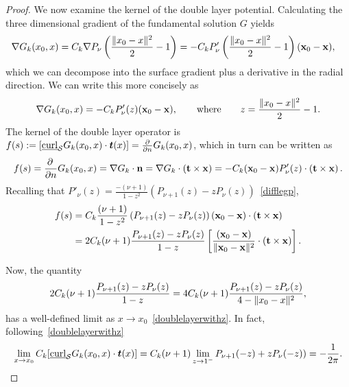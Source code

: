 \begin{proof}
We now examine the kernel of the double layer potential. Calculating the
three dimensional gradient of the fundamental solution $G$ yields
\begin{align*}
  \nabla G_k(x_0,x) &= C_k \nabla P_\nu\left(
    \frac{\|x_0-x\|^2}{2}-1\right) = 
  -C_k P'_\nu\left(\frac{\|x_0-x\|^2}{2}-1\right)
    (\mathbf{x}_{0}-\mathbf{x}),
\end{align*}
which we can decompose into the surface gradient plus a derivative in
the radial direction. We can write this more concisely as
\begin{align*}
\nabla G_k(x_0,x)=-C_k P'_{\nu}(z) (\mathbf{x}_0-\mathbf{x}), 
  \qquad \mbox{where}\qquad z=\frac{\|{ x_0}-{x}\|^2}{2}-1.
\end{align*} 
The kernel of the double layer operator is $f(s): =
[\underline{\mbox{curl}}_{\S}G_{k}(x_{0},x) \cdot \vec{t}(x)]=
\frac{\partial}{\partial n} G_k({x}_{0},{x})$, which in turn can be
written as 
\begin{align*}
 f(s)=\frac{\partial \, }{\partial n} G_{k}(x_{0},x) 
 =\nabla G_{k} \cdot \mathbf{n} = \nabla G_k\cdot \left( \mathbf{t}
 \times \mathbf{x} \right) 
 =-C_k (\mathbf{x}_0-\mathbf{x})P'_{\nu}(z)\cdot \left(
 \mathbf{t} \times \mathbf{x} \right).
\end{align*}
Recalling that $P'_{\nu}(z)=\frac{-(\nu+1)}{1-z^2}(P_{\nu+1}(z)-z
P_{\nu}(z))$~\eqref{difflegp},
\begin{align}
  f(s) &= C_k \frac{(\nu+1)}{1-z^2}\left(
  P_{\nu+1}(z)-zP_{\nu}(z)\right) 
  (\mathbf{x}_0-\mathbf{x})\cdot \left(
  \mathbf{t} \times {\mathbf x} \right) \nonumber\\
  &= 2C_k(\nu+1)\frac{P_{\nu+1}(z)-zP_{\nu}(z)}{1-z} \left[
  \frac{(\mathbf{x}_0-\mathbf{x})}{\|\mathbf{x}_{0}-\mathbf{x}\|^2}
  \cdot \left( \mathbf{t} \times \mathbf{x} \right)\right].
  \label{kern1}
\end{align} 

Now, the quantity
\begin{align*}
  2C_k(\nu+1)\frac{P_{\nu+1}(z)-zP_{\nu}(z)}{1-z}
  =4C_k(\nu+1)\frac{P_{\nu+1}(z)-zP_{\nu}(z)}{4-\|{x_0}-{x}\|^2},
\end{align*}
has a well-defined limit as $x \rightarrow
x_{0}$~\eqref{doublelayerwithz}. In fact,
following~\eqref{doublelayerwithz}
\begin{align*}
  \lim_{x\rightarrow x_0} 
  \C[\underline{\mbox{curl}}_{\S}G_{k}(x_{0},x) \cdot \vec{t}(x)] 
  = \C(\nu+1)\lim_{z\rightarrow 1^-}
  P_{\nu+1}(-z)+zP_{\nu}(-z)) = -\frac{1}{2\pi}.
\end{align*}


\end{proof}
